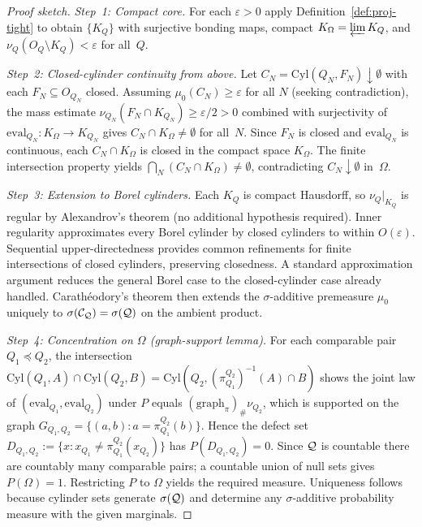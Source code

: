 \begin{proof}[Proof sketch]
\textit{Step~1: Compact core.}
For each $\varepsilon>0$ apply Definition~\ref{def:proj-tight} to
obtain $\{K_Q\}$ with surjective bonding maps, compact $K_\Omega=\varprojlim K_Q$,
and $\nu_Q(O_Q\setminus K_Q)<\varepsilon$ for all~$Q$.

\medskip
\noindent\textit{Step~2: Closed-cylinder continuity from above.}
Let $C_N=\mathrm{Cyl}(Q_N,F_N)\downarrow\emptyset$ with each $F_N\subseteq O_{Q_N}$
closed.  Assuming $\mu_0(C_N)\ge\varepsilon$ for all $N$ (seeking contradiction),
the mass estimate $\nu_{Q_N}(F_N\cap K_{Q_N})\ge\varepsilon/2>0$ combined with
surjectivity of $\mathrm{eval}_{Q_N}:K_\Omega\to K_{Q_N}$ gives
$C_N\cap K_\Omega\ne\emptyset$ for all~$N$.
Since $F_N$ is closed and $\mathrm{eval}_{Q_N}$ is continuous, each
$C_N\cap K_\Omega$ is closed in the compact space $K_\Omega$.
The finite intersection property yields
$\bigcap_N(C_N\cap K_\Omega)\ne\emptyset$,
contradicting $C_N\downarrow\emptyset$ in~$\Omega$.

\medskip
\noindent\textit{Step~3: Extension to Borel cylinders.}
Each $K_Q$ is compact Hausdorff, so $\nu_Q|_{K_Q}$ is regular by
Alexandrov's theorem (no additional hypothesis required).
Inner regularity approximates every Borel cylinder by closed cylinders
to within $O(\varepsilon)$.
Sequential upper-directedness provides common refinements for finite
intersections of closed cylinders, preserving closedness.
A standard approximation argument reduces the general Borel case to
the closed-cylinder case already handled.
Carathéodory's theorem then extends the $\sigma$-additive premeasure
$\mu_0$ uniquely to $\sigma(\mathcal{C}_{\mathcal{Q}})=\sigma(\mathcal{Q})$ on the
ambient product.

\medskip
\noindent\textit{Step~4: Concentration on $\Omega$ (graph-support lemma).}
For each comparable pair $Q_1\preceq Q_2$, the intersection
$\mathrm{Cyl}(Q_1,A)\cap\mathrm{Cyl}(Q_2,B)=\mathrm{Cyl}(Q_2,(\pi^{Q_2}_{Q_1})^{-1}(A)\cap B)$
shows the joint law of $(\mathrm{eval}_{Q_1},\mathrm{eval}_{Q_2})$ under $P$
equals $(\mathrm{graph}_{\pi})_\#\nu_{Q_2}$, which is supported on
the graph $G_{Q_1,Q_2}=\{(a,b):a=\pi^{Q_2}_{Q_1}(b)\}$.
Hence the defect set $D_{Q_1,Q_2}:=\{x:x_{Q_1}\ne\pi^{Q_2}_{Q_1}(x_{Q_2})\}$
has $P(D_{Q_1,Q_2})=0$.
Since $\mathcal{Q}$ is countable there are countably many comparable pairs;
a countable union of null sets gives $P(\Omega)=1$.
Restricting $P$ to $\Omega$ yields the required measure.
Uniqueness follows because cylinder sets generate $\sigma(\mathcal{Q})$
and determine any $\sigma$-additive probability measure with the
given marginals.
\end{proof}

